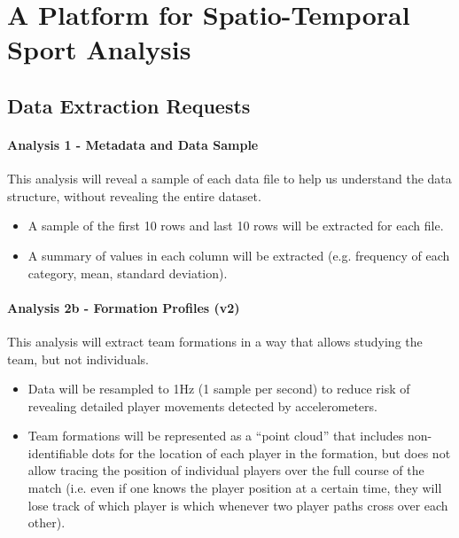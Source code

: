 
\openchapterblock

\chapter{A Platform for Spatio-Temporal Sport Analysis}

\section{Data Extraction Requests}
\label{appendixsec:data-extraction-request}

\subsubsection{Analysis 1 - Metadata and Data Sample}
This analysis will reveal a sample of each data file to help us understand the data structure, without revealing the entire dataset.

\begin{itemize}
  \item A sample of the first 10 rows and last 10 rows will be extracted for each file.
  \item A summary of values in each column will be extracted (e.g. frequency of each category, mean, standard deviation).
\end{itemize}

\subsubsection{Analysis 2b - Formation Profiles (v2)}
This analysis will extract team formations in a way that allows studying the team, but not individuals.

\begin{itemize}
  \item Data will be resampled to 1Hz (1 sample per second) to reduce risk of revealing detailed player movements detected by accelerometers.
  \item Team formations will be represented as a ``point cloud'' that includes non-identifiable dots for the location of each player in the formation, but does not allow tracing the position of individual players over the full course of the match (i.e. even if one knows the player position at a certain time, they will lose track of which player is which whenever two player paths cross over each other).
\end{itemize}

